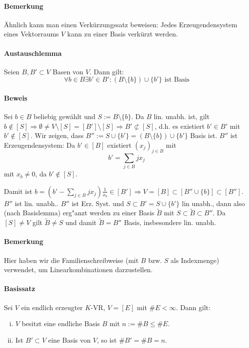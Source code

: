 \paragraph{Bemerkung}
    Ähnlich kann man einen Verkürzungssatz beweisen: Jedes Erzeugendensystem eines Vektorraums $V$ kann zu einer Basis verkürzt werden.

\paragraph{Austauschlemma}
    Seien $B,B' \subset V$ Basen von $V$. Dann gilt:
    \begin{equation*}
        \forall b\in B \exists b' \in B': (B\setminus\{b\})\cup\{b'\} \text{ ist Basis}
    \end{equation*}
    
\paragraph{Beweis}
    Sei $b\in B$ beliebig gewählt und $S:= B\setminus \{b\}$. Da $B$ lin. unabh. ist, gilt $b\notin [S] \Rightarrow \emptyset \neq V\setminus [S] = [B']\setminus [S] \Rightarrow B' \not\subset [S]$, d.h. es existiert $b' \in B'$ mit $b' \notin [S]$. Wir zeigen, dass $B'' := S\cup \{b'\} = (B\setminus\{b\})\cup \{b'\}$ Basis ist. $B''$ ist Erzeugendensystem: Da $b'\in [B]$ existiert $(x_j)_{j\in B}$ mit $$b' = \sum_{j\in B} jx_j $$ mit $x_b \neq 0$, da $b' \notin [S]$.

    Damit ist $b=(b'-\sum_{j\in B} jx_j)\frac{1}{x_b} \in [B'] \Rightarrow V = [B] \subset [B'' \cup \{b\}] \subset [B'']$.
    $B''$ ist lin. unabh.. $B''$ ist Erz. Syst. und $S\subset B' = S \cup \{b'\}$ lin unabh., dann also (nach Basislemma) erg"anzt werden zu einer Basis $\tilde{B}$ mit $S\subset \tilde{B}\subset B''$.
    Da $[S] \neq V$ gilt $\tilde{B} \neq S$ und damit $\tilde{B} = B''$ Basis, insbesondere lin. unabh.
    
\paragraph{Bemerkung}
    Hier haben wir die Familienschreibweise (mit $B$ bzw. $S$ als Indexmenge) verwendet, um Linearkombinationen darzustellen.
    
\paragraph{Basissatz}
    Sei $V$ ein endlich erzeugter $K$-VR, $V=[E]$ mit $\#E < \infty$. Dann gilt:
    \begin{enumerate}[(i)]
   		\item $V$ besitzt eine endliche Basis $B$ mit $n:= \#B \leq \#E$.
    	\item Ist $B'\subset V$ eine Basis von $V$, so ist $\#B' = \#B = n$.
    \end{enumerate}
    

